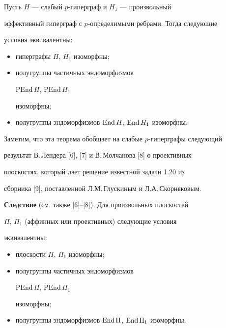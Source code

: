  


\begin{thm} 


Пусть $H$ --- слабый $p$-гиперграф и $H_1$ --- произвольный 


эффективный гиперграф с $p$-определимыми ребрами. Тогда следующие 


условия эквивалентны$:$ 


\begin{itemize} 


\item[1)] гиперграфы $H$, $H_1$ изоморфны$;$ 


\item[2)] полугруппы частичных эндоморфизмов


$\mathrm{PEnd}\,H$, $\mathrm{PEnd}\,H_1$ 


изоморфны$;$ 


\item[3)] полугруппы эндоморфизмов $\operatorname{End} H$, $\operatorname{End} H_1$ изоморфны. 


\end{itemize} 


\end{thm} 


 


Заметим, что эта теорема обобщает на слабые $p$-гиперграфы следующий 


результат В.\,Лендера [6], [7] и В.\,Молчанова [8] о проективных 


плоскостях, который дает решение известной задачи 1.20 из 


сборника [9], поставленной Л.М.\,Глускиным и Л.А.\,Скорняковым. 


\medskip 


 


{\bf Следствие} (см. также [6]--[8]). Для произвольных плоскостей 


$\Pi$, $\Pi_1$ (аффинных или проективных) следующие условия 


эквивалентны: 


\begin{itemize} 


\item[1)] плоскости $\Pi$, $\Pi_1$ изоморфны; 


\item[2)] полугруппы частичных эндоморфизмов


$\mathrm{PEnd}\,\Pi$, $\mathrm{PEnd}\,\Pi_1$ 


изоморфны; 


\item[3)] полугруппы эндоморфизмов $\operatorname{End}\Pi$, $\operatorname{End}\Pi_1$ изоморфны. 


\end{itemize} 


